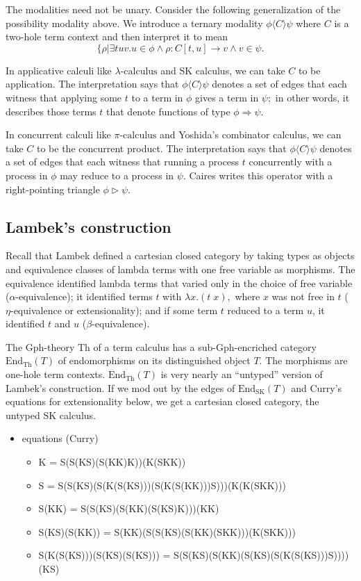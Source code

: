 \documentclass[a4paper,UKenglish]{article}
\newcommand{\maps}{\colon}
\newcommand{\End}{\mathrm{End}}
\newcommand{\Th}{\mathrm{Th}}
\newcommand{\pic}{$\pi\mbox{-calculus}$\xspace}
\newcommand{\lac}{$\lambda\mbox{-calculus}$\xspace}
\begin{document}
The modalities need not be unary.  Consider the following generalization of the possibility modality above.  We introduce a ternary modality $\phi \langle C \rangle \psi$ where $C$ is a two-hole term context and then interpret it to mean 
\[\{ \rho | \exists tuv. u \in \phi \land \rho\maps C[t, u] \to v \land v \in \psi.\]

In applicative calculi like \lac and SK calculus, we can take $C$ to be application.  The interpretation says that $\phi \langle C \rangle \psi$ denotes a set of edges that each witness that applying some $t$ to a term in $\phi$ gives a term in $\psi;$ in other words, it describes those terms $t$ that denote functions of type $\phi \Rightarrow \psi.$

In concurrent calculi like \pic and Yoshida's combinator calculus, we can take $C$ to be the concurrent product.  The interpretation says that $\phi \langle C \rangle \psi$ denotes a set of edges that each witness that running a process $t$ concurrently with a process in $\phi$ may reduce to a process in $\psi.$  Caires writes this operator with a right-pointing triangle $\phi \triangleright \psi.$

\subsection{Lambek's construction}

Recall that Lambek defined a cartesian closed category by taking types as objects and equivalence classes of lambda terms with one free variable as morphisms.  The equivalence identified lambda terms that varied only in the choice of free variable ($\alpha\mbox{-}$equivalence); it identified terms $t$ with $\lambda x.(t\; x),$ where $x$ was not free in $t$ ($\eta\mbox{-}$equivalence or extensionality); and if some term $t$ reduced to a term $u$, it identified $t$ and $u$ ($\beta\mbox{-}$equivalence).

The Gph-theory Th of a term calculus has a sub-Gph-encriched category $\End_\Th(T)$ of endomorphisms on its distinguished object $T.$  The morphisms are one-hole term contexts.  $\End_\Th(T)$ is very nearly an ``untyped'' version of Lambek's construction.  If we mod out by the edges of $\End_{\mbox{SK}}(T)$ and Curry's equations for extensionality below, we get a cartesian closed category, the untyped SK calculus.

\begin{itemize}
  \item equations (Curry)
    \begin{itemize}
      \item K = S(S(KS)(S(KK)K))(K(SKK))
      \item S = S(S(KS)(S(K(S(KS)))(S(K(S(KK)))S)))(K(K(SKK)))
      \item S(KK) = S(S(KS)(S(KK)(S(KS)K)))(KK)
      \item S(KS)(S(KK)) = S(KK)(S(S(KS)(S(KK)(SKK)))(K(SKK)))
      \item S(K(S(KS)))(S(KS)(S(KS))) = S(S(KS)(S(KK)(S(KS)(S(K(S(KS)))S))))(KS)
    \end{itemize}
\end{itemize}
\end{document}
